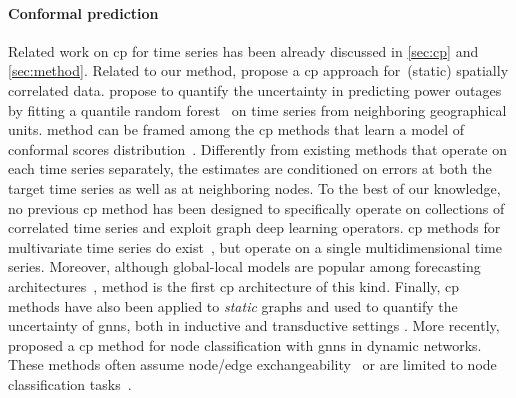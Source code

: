 \paragraph{Conformal prediction} Related work on \gls{cp} for time series  has been already discussed in \autoref{sec:cp} and \autoref{sec:method}. Related to our method, \citet{mao2024valid} propose a \gls{cp} approach for~(static) spatially correlated data. \citet{jiang2024spatio} propose to quantify the uncertainty in predicting power outages by fitting a quantile random forest~\cite{meinshausen2006quantile} on time series from neighboring geographical units.
\gls{method} can be framed among the \gls{cp} methods that learn a model of conformal scores distribution~\citep{xu2023sequential, lee2024conformal}. Differently from existing methods that operate on each time series separately, the estimates are conditioned on errors at both the target time series as well as at neighboring nodes.
To the best of our knowledge, no previous \gls{cp} method has been designed to specifically operate on collections of correlated time series and exploit graph deep learning operators. \gls{cp} methods for multivariate time series do exist~\cite{xu2024conformal, sun2024copula}, but operate on a single multidimensional time series. Moreover, although global-local models are popular among forecasting architectures~\cite{smyl2020hybrid, benidis2022deep}, \gls{method} is the first \gls{cp} architecture of this kind. Finally, \gls{cp} methods have also been applied to \textit{static} graphs and used to quantify the uncertainty of \glspl{gnn}, both in inductive \cite{zargarbashi2023conformal} and transductive settings \cite{huang2024uncertainty}. More recently, \citet{davis2024valid} proposed a \gls{cp} method for node classification with \glspl{gnn} in dynamic networks. These methods often assume node/edge exchangeability~\cite{zargarbashi2023conformal, huang2024uncertainty} or are limited to node classification tasks~\cite{clarkson2023distribution}. 


